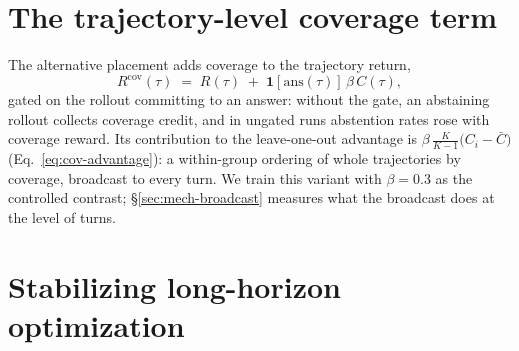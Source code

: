 \begin{table}[t]
\centering
\small
{}
\caption{Evidence reachability at top-10 dense retrieval under three
query regimes and three corpora. The decomposition oracle uses the
official sub-questions with gold intermediate answers; the title oracle
queries with the gold paragraphs' titles.}
\label{tab:reach}
\end{table}

\section{The trajectory-level coverage term}
\label{app:traj}
\label{sec:method-effect}

The alternative placement adds coverage to the trajectory return,
\begin{equation}
R^{\mathrm{cov}}(\tau) \;=\; R(\tau) \;+\;
\mathbf{1}\!\left[\mathrm{ans}(\tau)\right]\, \beta\, C(\tau),
\label{eq:covreward}
\end{equation}
gated on the rollout committing to an answer: without the gate, an
abstaining rollout collects coverage credit, and in ungated runs
abstention rates rose with coverage reward. Its contribution to the
leave-one-out advantage is $\beta\,\tfrac{K}{K-1}\bigl(C_i -
\bar{C}\bigr)$ (Eq.~\ref{eq:cov-advantage}): a within-group ordering of
whole trajectories by coverage, broadcast to every turn. We train this
variant with $\beta=0.3$ as the controlled contrast; \S\ref{sec:mech-broadcast}
measures what the broadcast does at the level of turns.

\section{Stabilizing long-horizon optimization}
\label{app:kl}
\label{sec:method-kl}

